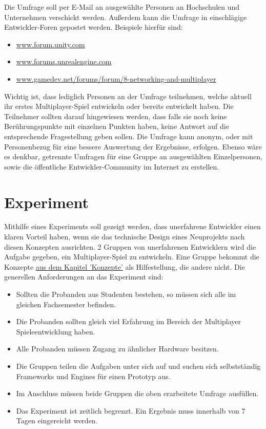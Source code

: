 Die Umfrage soll per E-Mail an ausgewählte Personen an Hochschulen und Unternehmen verschickt werden. Außerdem kann die Umfrage in einschlägige Entwickler-Foren gepostet werden. Beispiele hierfür sind:
\begin{itemize}
	\item \href{www.forum.unity.com}{www.forum.unity.com}
	\item \href{www.forums.unrealengine.com}{www.forums.unrealengine.com}
	\item \href{www.gamedev.net/forums/forum/8-networking-and-multiplayer}{www.gamedev.net/forums/forum/8-networking-and-multiplayer}
\end{itemize}

Wichtig ist, dass lediglich Personen an der Umfrage teilnehmen, welche aktuell ihr erstes Multiplayer-Spiel entwickeln oder bereits entwickelt haben. Die Teilnehmer sollten darauf hingewiesen werden, dass falls sie noch keine Berührungspunkte mit einzelnen Punkten haben, keine Antwort auf die entsprechende Fragestellung geben sollen. Die Umfrage kann anonym, oder mit Personenbezug für eine bessere Auswertung der Ergebnisse, erfolgen. Ebenso wäre es denkbar, getrennte Umfragen für eine Gruppe an ausgewählten Einzelpersonen, sowie die öffentliche Entwickler-Community im Internet zu erstellen.

\section{Experiment}

Mithilfe eines Experiments soll gezeigt werden, dass unerfahrene Entwickler einen klaren Vorteil haben, wenn sie das technische Design eines Neuprojekts nach diesen Konzepten ausrichten. 2 Gruppen von unerfahrenen Entwicklern wird die Aufgabe gegeben, ein Multiplayer-Spiel zu entwickeln. Eine Gruppe bekommt die Konzepte \hyperref[sec:konzepte]{aus dem Kapitel 'Konzepte'} als Hilfestellung, die andere nicht. Die generellen Anforderungen an das Experiment sind:

\begin{itemize}
	\item Sollten die Probanden aus Studenten bestehen, so müssen sich alle im gleichen Fachsemester befinden.
	\item Die Probanden sollten gleich viel Erfahrung im Bereich der Multiplayer Spieleentwicklung haben.
	\item Alle Probanden müssen Zugang zu ähnlicher Hardware besitzen.
	\item Die Gruppen teilen die Aufgaben unter sich auf und suchen sich selbstständig Frameworks und Engines für einen Prototyp aus.
	\item Im Anschluss müssen beide Gruppen die oben erarbeitete Umfrage ausfüllen.
	\item Das Experiment ist zeitlich begrenzt. Ein Ergebnis muss innerhalb von 7 Tagen eingereicht werden. 
\end{itemize}

